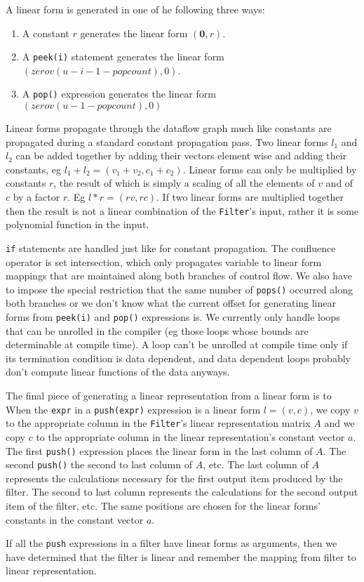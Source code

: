 A linear form is generated in one of he following three ways:
\begin{enumerate}
\item A constant $r$ generates the linear form $({\mathbf 0},r)$. 
\vspace{-6pt}

\item A {\tt peek(i)} statement generates the linear form 
$(zerov(u-i-1-popcount), 0)$.
\vspace{-6pt}

\item A {\tt pop()} expression generates the linear form 
$(zerov(u-1-popcount),0)$

\vspace{-6pt}
\end{enumerate}


Linear forms propagate through the dataflow graph much like constants are propagated
during a standard constant propagation pass. Two linear forms $l_{1}$ and $l_{2}$ can
be added together by adding their vectors element wise and adding their constants, eg 
$l_1+l_2=(v_1+v_2, c_1+c_2)$. Linear forms can only be multiplied by constants $r$, 
the result of which is simply a scaling of all the elements of $v$ and of $c$ by a factor
$r$. Eg $l*r = (rv,rc)$. If two linear forms are multiplied together 
then the result is not a linear combination of the {\tt Filter}'s input, rather it is
some polynomial function in the input.

{\tt if} statements are handled just like for constant propagation. The confluence operator
is set intersection, which only propagates variable to linear form mappings that are
maintained along both branches of control flow. We also have to impose the special restriction that the
same number of {\tt pops()} occurred along both branches or we don't know what the current offset
for generating linear forms from {\tt peek(i)} and {\tt pop()} expressions is. 
We currently only handle loops that can be unrolled in the 
compiler (eg those loops whose bounds are determinable at compile time). 
A loop can't be unrolled at compile time only if its termination condition is data 
dependent, and data dependent loops probably don't compute linear 
functions of the data anyways.


The final piece of generating a linear representation from a linear form is to 
When the {\tt expr} in a {\tt push(expr)} expression is a linear form $l=(v,c)$, 
we copy $v$ to the appropriate column in the {\tt Filter}'s linear representation matrix $A$ 
and we copy $c$ to the appropriate column in the linear representation's constant vector $a$.
The first {\tt push()} expression places the linear form in the last column of $A$. The second
{\tt push()} the second to last column of $A$, etc. The last column of $A$ represents 
the calculations necessary for the first output item produced by the filter. The second to last
column represents the calculations for the second output item of the filter, etc.
The same positions are chosen for the linear forms' constants in the constant vector $a$.

If all the {\tt push} expressions in a filter have linear forms as arguments, 
then we have determined that the filter is linear and remember the mapping from 
filter to linear representation.
